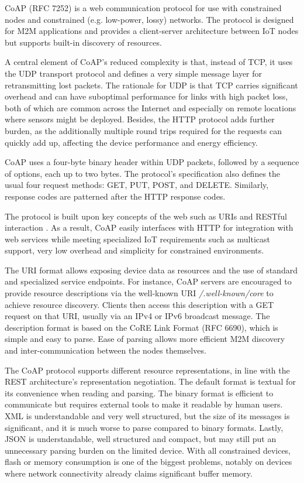CoAP \cite{bormann2012coap} (RFC 7252) is a web communication protocol for use with constrained nodes and constrained (e.g. low-power, lossy) networks. The protocol is designed for M2M applications and provides a client-server architecture between IoT nodes but supports built-in discovery of resources.

A central element of CoAP's reduced complexity is that, instead of TCP, it uses the UDP transport protocol and defines a very simple message layer for retransmitting lost packets. The rationale for UDP is that TCP carries significant overhead and can have suboptimal performance for links with high packet loss, both of which are common across the Internet \cite{nygren2010akamai} and especially on remote locations where sensors might be deployed. Besides, the HTTP protocol adds further burden, as the additionally multiple round trips required for the requests can quickly add up, affecting the device performance and energy efficiency.

CoAP uses a four-byte binary header within UDP packets, followed by a sequence of options, each up to two bytes. The protocol's specification also defines the usual four request methods: GET, PUT, POST, and DELETE. Similarly, response codes are patterned after the HTTP response codes.

The protocol is built upon key concepts of the web such as URIs and RESTful interaction \cite{pereira2013enabling}. As a result, CoAP easily interfaces with HTTP for integration with web services while meeting specialized IoT requirements such as multicast support, very low overhead and simplicity for constrained environments. 

The URI format allows exposing device data as resources and the use of standard and specialized service endpoints. For instance, CoAP servers are encouraged to provide resource descriptions via the well-known URI \emph{/.well-known/core} to achieve resource discovery. Clients then access this description with a GET request on that URI, usually via an IPv4 or IPv6 broadcast message. The description format is based on the CoRE Link Format (RFC 6690), which is simple and easy to parse. Ease of parsing allows more efficient M2M discovery and inter-communication between the nodes themselves.

The CoAP protocol supports different resource representations, in line with the REST architecture's representation negotiation. The default format is textual for its convenience when reading and parsing. The binary format is efficient to communicate but requires external tools to make it readable by human users. XML is understandable and very well structured, but the size of its messages is significant, and it is much worse to parse compared to binary formats. Lastly, JSON is understandable, well structured and compact, but may still put an unnecessary parsing burden on the limited device. With all constrained devices, flash or memory consumption is one of the biggest problems, notably on devices where network connectivity already claims significant buffer memory.

